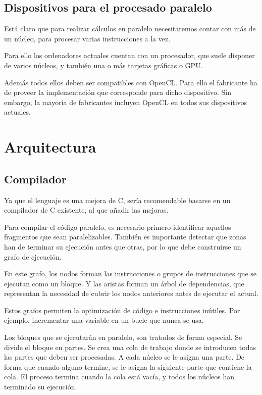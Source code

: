 \documentclass[12pt,a4paper]{article}
\begin{document}
\subsection{Dispositivos para el procesado paralelo}
Está claro que para realizar cálculos en paralelo necesitaremos contar con más 
de un núcleo, para procesar varias instrucciones a la vez.

Para ello los ordenadores actuales cuentan con un procesador, que suele disponer 
de varios núcleos, y también una o más tarjetas gráficas o GPU.

Además todos ellos deben ser compatibles con OpenCL. Para ello el fabricante ha 
de proveer la implementación que corresponde para dicho dispositivo. Sin 
embargo, la mayoría de fabricantes incluyen OpenCL en todos sus dispositivos 
actuales.



\section{Arquitectura}

\subsection{Compilador}
Ya que el lenguaje es una mejora de C, sería recomendable basarse en un 
compilador de C existente, al que añadir las mejoras.

Para compilar el código paralelo, es necesario primero identificar aquellos 
fragmentos que sean paralelizables. También es importante detectar que zonas han 
de terminar su ejecución antes que otras, por lo que debe construirse un grafo 
de ejecución.

En este grafo, los nodos forman las instrucciones o grupos de instrucciones que 
se ejecutan como un bloque. Y las aristas forman un árbol de dependencias, que 
representan la necesidad de cubrir los nodos anteriores antes de ejecutar el 
actual.

Estos grafos permiten la optimización de código e instrucciones inútiles. Por 
ejemplo, incrementar una variable en un bucle que nunca se usa.

Los bloques que se ejecutarán en paralelo, son tratados de forma especial. Se 
divide el bloque en partes. Se crea una cola de trabajo donde se introducen 
todas las partes que deben ser procesadas. A cada núcleo se le asigna una parte.  
De forma que cuando alguno termine, se le asigna la siguiente parte que contiene 
la cola. El proceso termina cuando la cola está vacía, y todos los núcleos han 
terminado su ejecución.
\end{document}

